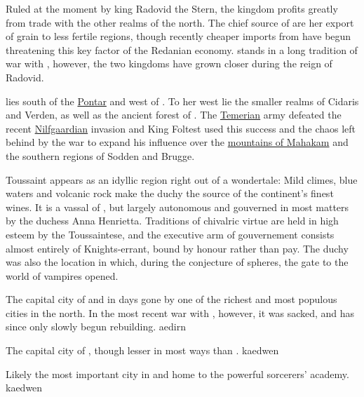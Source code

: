 {
    Ruled at the moment by king Radovid the Stern, the kingdom profits greatly from trade with the other realms of the north.
    The chief source of  are her export of grain to less fertile regions, though recently cheaper
    imports from  have begun threatening this key factor of the Redanian economy.
     stands in a long tradition of war with , however, the two kingdoms have
    grown closer during the reign of Radovid.
}

{
     lies south of the \hyperref[region:pontar]{Pontar} and west of . To her west lie the smaller realms of 
    Cidaris and Verden, as well as the ancient forest of . The \hyperref[realm:temeria]{Temerian} army defeated the recent 
    \hyperref[realm:nilfgaard]{Nilfgaardian} invasion and King Foltest used this success and the chaos left behind by the war
    to expand his influence over the \hyperref[region:mahakamMtns]{mountains of Mahakam} and the southern regions of Sodden and Brugge.
}

{
    Toussaint appears as an idyllic region right out of a wondertale: Mild climes, blue waters and volcanic rock make 
    the duchy the source of the continent's finest wines. It is a vassal of , but largely 
    autonomous and gouverned in most matters by the duchess Anna Henrietta. Traditions of chivalric virtue are held in 
    high esteem by the Toussaintese, and the executive arm of gouvernement consists almost entirely of Knights-errant,
    bound by honour rather than pay. The duchy was also the location in which, during the conjecture of spheres, the 
    gate to the world of vampires opened.
}

{
    The capital city of  and in days gone by one of the richest and most populous cities in the north. In the most recent war
    with , however, it was sacked, and has since only slowly begun rebuilding.
}
{aedirn}

{ 
    The capital city of , though lesser in most ways than .
}
{kaedwen}

{
    Likely the most important city in  and home to the powerful sorcerers' academy.
}
{kaedwen}

